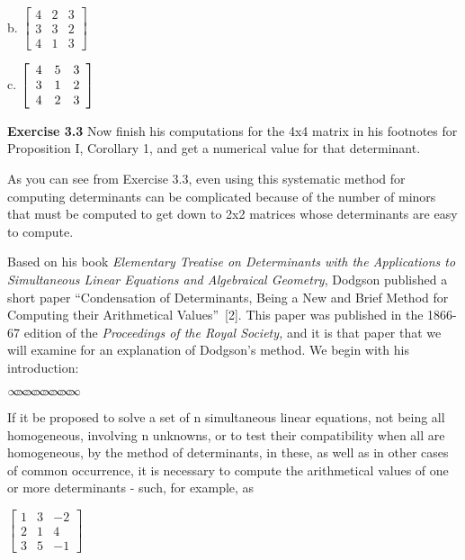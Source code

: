 \documentclass[11pt]{article}%
\theoremstyle{definition}
\newcommand{\sep}{\vspace{-3pt} \begin{center}
{\mathversion{normal}
$\infty \mspace{-5.5mu} \infty \mspace{-5.5mu}
\infty \mspace{-5.5mu} \infty \mspace{-5.5mu}
\infty \mspace{-5.5mu} \infty \mspace{-5.5mu}
\infty \mspace{-5.5mu} \infty$}
\end{center} \vspace{-3pt}}
\begin{document}
b. $%
\begin{bmatrix}
4 & 2 & 3\\
3 & 3 & 2\\
4 & 1 & 3
\end{bmatrix}
$

c. $\left[
\begin{array}
[c]{ccc}%
4 & 5 & 3\\
3 & 1 & 2\\
4 & 2 & 3
\end{array}
\right]  $

\bigskip

\noindent\textbf{Exercise 3.3} Now finish his computations for the 4x4 matrix
in his footnotes for Proposition I, Corollary 1, and get a numerical value for
that determinant.

\bigskip

As you can see from Exercise 3.3, even using this systematic method for
computing determinants can be complicated because of the number of minors that
must be computed to get down to 2x2 matrices whose determinants are easy to compute.

Based on his book \textit{Elementary Treatise on Determinants with the
Applications to Simultaneous Linear Equations and Algebraical Geometry},
Dodgson published a short paper \textquotedblleft Condensation of
Determinants, Being a New and Brief Method for Computing their Arithmetical
Values\textquotedblright\ [2]. This paper was published in the 1866-67 edition
of the \textit{Proceedings of the Royal Society,} and it is that paper that we
will examine for an explanation of Dodgson's method. We begin with his introduction:%

\sep


\textsf{If it be proposed to solve a set of n simultaneous linear equations,
not being all homogeneous, involving n unknowns, or to test their
compatibility when all are homogeneous, by the method of determinants, in
these, as well as in other cases of common occurrence, it is necessary to
compute the arithmetical values of one or more determinants - such, for
example, as}

\begin{center}
$%
\begin{bmatrix}
1 & 3 & -2\\
2 & 1 & 4\\
3 & 5 & -1
\end{bmatrix}
$
\end{center}
\end{document}
